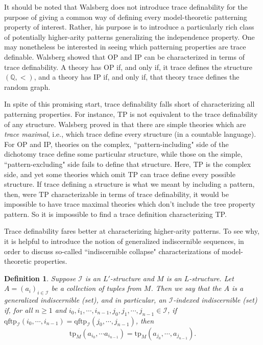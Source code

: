 \documentclass[10pt,a4paper]{amsart}
\newcommand{\bbQ}{\mathbb{Q}}
\newcommand{\calI}{\mathcal{I}}
\newcommand{\tp}{\text{tp}}
\newcommand{\qftp}{\text{qftp}}
\newtheorem{definition}{Definition}
\begin{document}
It should be noted that Walsberg does not introduce trace definability for the purpose of giving a common way of defining every model-theoretic patterning property of interest. Rather, his purpose is to introduce a particularly rich class of potentially higher-arity patterns generalizing the independence property. One may nonetheless be interested in seeing which patterning properties are trace definable. Walsberg showed that OP and IP can be characterized in terms of trace definability. A theory has OP if, and only if, it trace defines the structure $(\bbQ,<)$, and a theory has IP if, and only if, that theory trace defines the random graph. 

In spite of this promising start, trace definability falls short of characterizing all patterning properties. For instance, TP is not equivalent to the trace definability of any structure. Walsberg proved in \cite{walsberg2025trace} that there are simple theories which are \textit{trace maximal}, i.e., which trace define every structure (in a countable language). For OP and IP, theories on the complex, ``pattern-including" side of the dichotomy trace define some particular structure, while those on the simple, ``pattern-excluding" side fails to define that structure. Here, TP is the complex side, and yet some theories which omit TP can trace define every possible structure. If trace defining a structure is what we meant by including a pattern, then, were $\mathrm{TP}$ characterizable in terms of trace definability, it would be impossible to have trace maximal theories which don't include the tree property pattern. So it is impossible to find a trace definition characterizing TP. 


Trace definability fares better at characterizing higher-arity patterns. To see why, it is helpful to introduce the notion of generalized indiscernible sequences, in order to discuss so-called ``indiscernible collapse" characterizations of model-theoretic properties. 

\begin{definition}{}
Suppose $\calI$ is an $L'$-structure and $M$ is an $L$-structure. Let $A=(a_i)_{i\in \calI}$ be a collection of tuples from $M$. Then we say that the $A$ is a \textit{generalized indiscernible (set)}, and in particular, an $\calI$\textit{-indexed indiscernible (set)} if, for all $n\geq 1$ and $i_0,i_1,\dotsm, i_{n-1},j_0,j_1,\dotsm, j_{n-1}\in \calI$, if $\qftp_\calI(i_0,\dotsm, i_{n-1})=\qftp_\calI(j_0,\dotsm, j_{n-1})$, then $$\tp_M(a_{i_0},\dotsm a_{i_{n-1}})=\tp_M(a_{j_0},\dotsm, a_{j_{n-1}}).$$
\end{definition}
\end{document}
